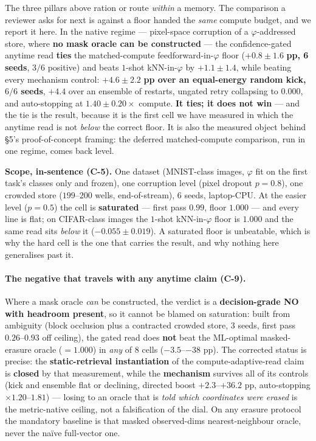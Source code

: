 \documentclass[11pt]{article}
\begin{document}
The three pillars above ration or route \emph{within} a memory. The comparison a reviewer asks for next is against a floor handed the \emph{same} compute budget, and we report it here. In the native regime --- pixel-space corruption of a $\varphi$-addressed store, where \textbf{no mask oracle can be constructed} --- the confidence-gated anytime read \textbf{ties} the matched-compute feedforward-in-$\varphi$ floor ($\mathbf{+0.8\pm1.6}$ \textbf{pp, 6 seeds}, $3/6$ positive) and beats $1$-shot kNN-in-$\varphi$ by $+1.1\pm1.4$, while beating every mechanism control: $\mathbf{+4.6\pm2.2}$ \textbf{pp over an equal-energy random kick, $6/6$ seeds}, $+4.4$ over an ensemble of restarts, ungated retry collapsing to $0.000$, and auto-stopping at $\mathbf{1.40\pm0.20\times}$ compute. \textbf{It ties; it does not win} --- and the tie is the result, because it is the first cell we have measured in which the anytime read is not \emph{below} the correct floor. It is also the measured object behind \S5's proof-of-concept framing: the deferred matched-compute comparison, run in one regime, comes back level.

\textbf{Scope, in-sentence (C-5).} One dataset (MNIST-class images, $\varphi$ fit on the first task's classes only and frozen), one corruption level (pixel dropout $p=0.8$), one crowded store ($199$--$200$ wells, end-of-stream), $6$ seeds, laptop-CPU. At the easier level ($p=0.5$) the cell is \textbf{saturated} --- first pass $0.99$, floor $1.000$ --- and every line is flat; on CIFAR-class images the $1$-shot kNN-in-$\varphi$ floor is $1.000$ and the same read sits \emph{below} it ($-0.055\pm0.019$). A saturated floor is unbeatable, which is why the hard cell is the one that carries the result, and why nothing here generalises past it.

\paragraph{The negative that travels with any anytime claim (C-9).} Where a mask oracle \emph{can} be constructed, the verdict is a \textbf{decision-grade NO with headroom present}, so it cannot be blamed on saturation: built from ambiguity (block occlusion plus a contracted crowded store, $3$ seeds, first pass $0.26$--$0.93$ off ceiling), the gated read does \textbf{not} beat the ML-optimal masked-erasure oracle ($=1.000$) in \emph{any} of $8$ cells ($-3.5$--$-38$ pp). The corrected status is precise: the \textbf{static-retrieval instantiation} of the compute-adaptive-read claim is \textbf{closed} by that measurement, while the \textbf{mechanism} survives all of its controls (kick and ensemble flat or declining, directed boost $+2.3$--$+36.2$ pp, auto-stopping $\times1.20$--$1.81$) --- losing to an oracle that is \emph{told which coordinates were erased} is the metric-native ceiling, not a falsification of the dial. On any erasure protocol the mandatory baseline is that masked observed-dims nearest-neighbour oracle, never the na\"ive full-vector one.
\end{document}
